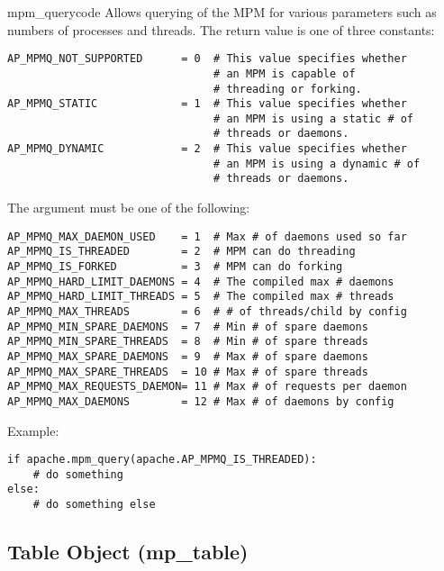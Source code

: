 \begin{funcdesc}{mpm_query}{code}
  Allows querying of the MPM for various parameters such as numbers of
  processes and threads. The return value is one of three constants:
  \begin{verbatim}
AP_MPMQ_NOT_SUPPORTED      = 0  # This value specifies whether 
                                # an MPM is capable of         
                                # threading or forking.        
AP_MPMQ_STATIC             = 1  # This value specifies whether 
                                # an MPM is using a static # of
                                # threads or daemons.          
AP_MPMQ_DYNAMIC            = 2  # This value specifies whether 
                                # an MPM is using a dynamic # of
                                # threads or daemons.          
  \end{verbatim}

  The  argument must be one of the following:
  \begin{verbatim}
AP_MPMQ_MAX_DAEMON_USED    = 1  # Max # of daemons used so far 
AP_MPMQ_IS_THREADED        = 2  # MPM can do threading         
AP_MPMQ_IS_FORKED          = 3  # MPM can do forking           
AP_MPMQ_HARD_LIMIT_DAEMONS = 4  # The compiled max # daemons   
AP_MPMQ_HARD_LIMIT_THREADS = 5  # The compiled max # threads   
AP_MPMQ_MAX_THREADS        = 6  # # of threads/child by config 
AP_MPMQ_MIN_SPARE_DAEMONS  = 7  # Min # of spare daemons       
AP_MPMQ_MIN_SPARE_THREADS  = 8  # Min # of spare threads       
AP_MPMQ_MAX_SPARE_DAEMONS  = 9  # Max # of spare daemons       
AP_MPMQ_MAX_SPARE_THREADS  = 10 # Max # of spare threads       
AP_MPMQ_MAX_REQUESTS_DAEMON= 11 # Max # of requests per daemon 
AP_MPMQ_MAX_DAEMONS        = 12 # Max # of daemons by config   
  \end{verbatim}

Example:
  \begin{verbatim}
if apache.mpm_query(apache.AP_MPMQ_IS_THREADED):
    # do something
else:
    # do something else
  \end{verbatim}
\end{funcdesc}

\subsection{Table Object (mp_table)\label{pyapi-mptable}}

